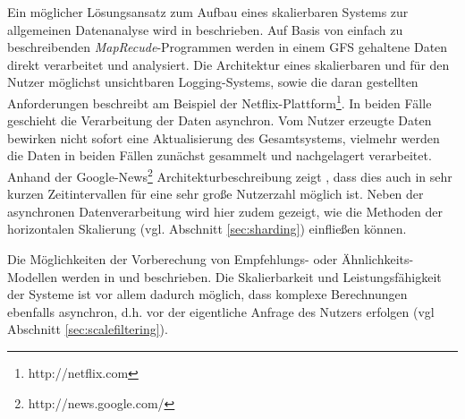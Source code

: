 Ein möglicher Lösungsansatz zum Aufbau eines skalierbaren Systems zur allgemeinen Datenanalyse wird in \citep{Lin2012} beschrieben. Auf Basis von einfach zu beschreibenden \textit{MapRecude}-Programmen werden in einem \acs{GFS} gehaltene Daten direkt verarbeitet und analysiert. Die Architektur eines skalierbaren und für den Nutzer möglichst unsichtbaren Logging-Systems, sowie die daran gestellten Anforderungen beschreibt \citep{netflix2012} am Beispiel der Netflix-Plattform\footnote{http://netflix.com}. In beiden Fälle geschieht die Verarbeitung der Daten asynchron. Vom Nutzer erzeugte Daten bewirken nicht sofort eine Aktualisierung des Gesamtsystems, vielmehr werden die Daten in beiden Fällen zunächst gesammelt und nachgelagert verarbeitet. Anhand der Google-News\footnote{http://news.google.com/} Architekturbeschreibung zeigt \citep{Das07}, dass dies auch in sehr kurzen Zeitintervallen für eine sehr große Nutzerzahl möglich ist. Neben der asynchronen Datenverarbeitung wird hier zudem gezeigt, wie die Methoden der horizontalen Skalierung (vgl. Abschnitt \ref{sec:sharding}) einfließen können.

Die Möglichkeiten der Vorberechung von Empfehlungs- oder Ähnlichkeits-Modellen werden in \citep{linden03} und \citep{Das07} beschrieben. Die Skalierbarkeit und Leistungsfähigkeit der Systeme ist vor allem dadurch möglich, dass komplexe Berechnungen ebenfalls asynchron, d.h. vor der eigentliche Anfrage des Nutzers erfolgen (vgl Abschnitt \ref{sec:scalefiltering}).
%

